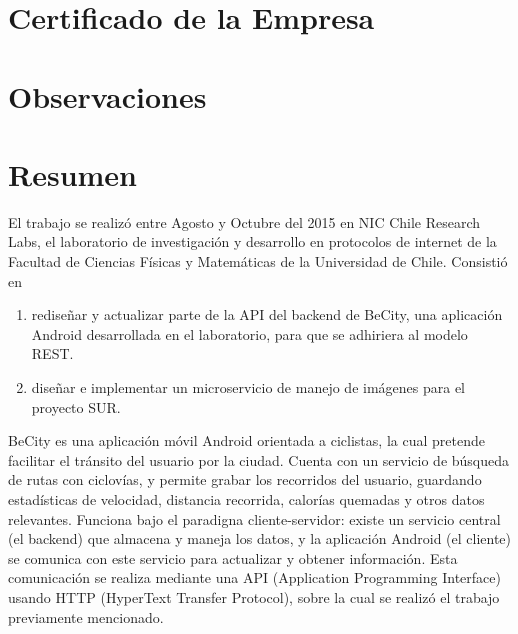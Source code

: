 \documentclass[11pt,letterpaper]{article}
\begin{document}
\newpage
\pagestyle{fancy}
\fancyhf{}


\fancyfoot[R]{\small \rm \textbf{\thepage}} %


\renewcommand{\sectionmark}[1]{\markright{\thesection.\ #1}}
\renewcommand{\headrulewidth}{0.5pt}
\renewcommand{\footrulewidth}{0.5pt}

\newpage
\section{Certificado de la Empresa}

\newpage
\section{Observaciones}
\newpage

\tableofcontents

\newpage
\section{Resumen}

El trabajo se realizó entre Agosto y Octubre del 2015 en NIC Chile Research Labs, el laboratorio de investigación y desarrollo en protocolos de internet de la Facultad de Ciencias Físicas y Matemáticas de la Universidad de Chile. \@ Consistió en
\begin{enumerate}
    \item rediseñar y actualizar parte de la API del backend de BeCity, una aplicación Android desarrollada en el laboratorio, para que se adhiriera al modelo REST.
    \item diseñar e implementar un microservicio de manejo de imágenes para el proyecto SUR.
\end{enumerate}

BeCity es una aplicación móvil Android orientada a ciclistas, la cual pretende facilitar el tránsito del usuario por la ciudad. Cuenta con un servicio de búsqueda de rutas con ciclovías, y permite grabar los recorridos del usuario, guardando estadísticas de velocidad, distancia recorrida, calorías quemadas y otros datos relevantes. Funciona bajo el paradigna cliente-servidor: existe un servicio central (el backend) que almacena y maneja los datos, y la aplicación Android (el cliente) se comunica con este servicio para actualizar y obtener información. Esta comunicación se realiza mediante una API (Application Programming Interface) usando HTTP (HyperText Transfer Protocol), sobre la cual se realizó el trabajo previamente mencionado.\\
\end{document}
